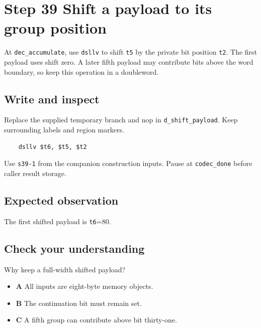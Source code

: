 \section{Step 39 Shift a payload to its group position}\label{delta-s39}

At \texttt{dec\_accumulate}, use \texttt{dsllv} to shift \texttt{t5} by the private bit position \texttt{t2}. The first payload uses shift zero. A later fifth payload may contribute bits above the word boundary, so keep this operation in a doubleword.

\subsection{Write and inspect}
Replace the supplied temporary branch and nop in \texttt{d\_shift\_payload}. Keep surrounding labels and region markers.

\begin{verbatim}
    dsllv $t6, $t5, $t2
\end{verbatim}
Use \texttt{s39-1} from the companion construction inputs. Pause at \texttt{codec\_done} before caller result storage.

\subsection{Expected observation}
The first shifted payload is \texttt{t6}=80.

\subsection{Check your understanding}
Why keep a full-width shifted payload?

\begin{itemize}
  \item \textbf{A} All inputs are eight-byte memory objects.
  \item \textbf{B} The continuation bit must remain set.
  \item \textbf{C} A fifth group can contribute above bit thirty-one.
\end{itemize}

